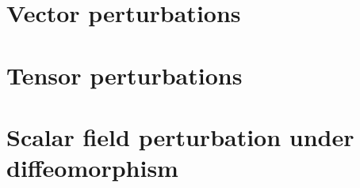 \documentclass[a4paper,11pt]{article}
\begin{document}
\section{Vector perturbations}



\section{Tensor perturbations}



\section{Scalar field perturbation under diffeomorphism}


\printbibliography
\end{document}
